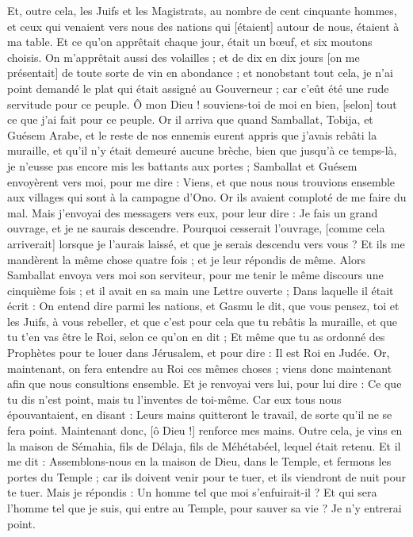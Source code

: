 \begin{multicols}{2}
{Et, outre cela, les Juifs et les Magistrats, au nombre de cent cinquante hommes, et ceux qui venaient vers nous des nations qui [étaient] autour de nous, étaient à ma table.
Et ce qu'on apprêtait chaque jour, était un bœuf, et six moutons choisis. On m'apprêtait aussi des volailles ; et de dix en dix jours [on me présentait] de toute sorte de vin en abondance ; et nonobstant tout cela, je n'ai point demandé le plat qui était assigné au Gouverneur ; car c'eût été une rude servitude pour ce peuple.
Ô mon Dieu ! souviens-toi de moi en bien, [selon] tout ce que j'ai fait pour ce peuple.
\VerseOne{}Or il arriva que quand Samballat, Tobija, et Guésem Arabe, et le reste de nos ennemis eurent appris que j'avais rebâti la muraille, et qu'il n'y était demeuré aucune brèche, bien que jusqu'à ce temps-là, je n'eusse pas encore mis les battants aux portes ;
Samballat et Guésem envoyèrent vers moi, pour me dire : Viens, et que nous nous trouvions ensemble aux villages qui sont à la campagne d'Ono. Or ils avaient comploté de me faire du mal.
Mais j'envoyai des messagers vers eux, pour leur dire : Je fais un grand ouvrage, et je ne saurais descendre. Pourquoi cesserait l'ouvrage, [comme cela arriverait] lorsque je l'aurais laissé, et que je serais descendu vers vous ?
Et ils me mandèrent la même chose quatre fois ; et je leur répondis de même.
Alors Samballat envoya vers moi son serviteur, pour me tenir le même discours une cinquième fois ; et il avait en sa main une Lettre ouverte ;
Dans laquelle il était écrit : On entend dire parmi les nations, et Gasmu le dit, que vous pensez, toi et les Juifs, à vous rebeller, et que c'est pour cela que tu rebâtis la muraille, et que tu t'en vas être le Roi, selon ce qu'on en dit ;
Et même que tu as ordonné des Prophètes pour te louer dans Jérusalem, et pour dire : Il est Roi en Judée. Or, maintenant, on fera entendre au Roi ces mêmes choses ; viens donc maintenant afin que nous consultions ensemble.
Et je renvoyai vers lui, pour lui dire : Ce que tu dis n'est point, mais tu l'inventes de toi-même.
Car eux tous nous épouvantaient, en disant : Leurs mains quitteront le travail, de sorte qu'il ne se fera point. Maintenant donc, [ô Dieu !] renforce mes mains.
Outre cela, je vins en la maison de Sémahia, fils de Délaja, fils de Méhétabéel, lequel était retenu. Et il me dit : Assemblons-nous en la maison de Dieu, dans le Temple, et fermons les portes du Temple ; car ils doivent venir pour te tuer, et ils viendront de nuit pour te tuer.
Mais je répondis : Un homme tel que moi s'enfuirait-il ? Et qui sera l'homme tel que je suis, qui entre au Temple, pour sauver sa vie ? Je n'y entrerai point.
}
\end{multicols}
